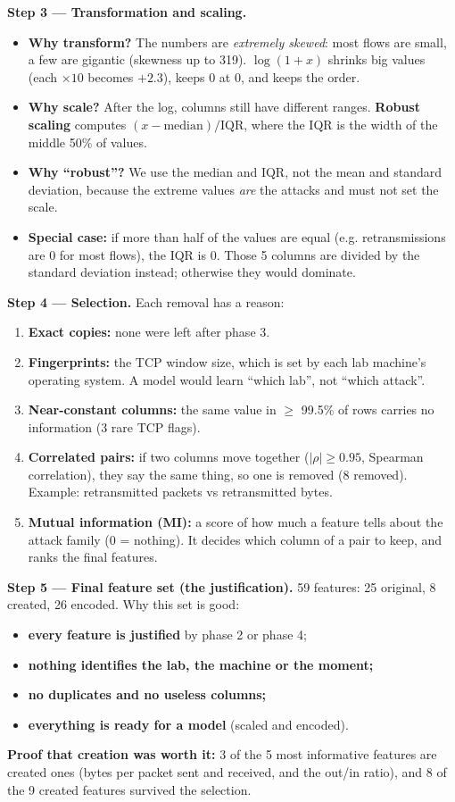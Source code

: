 \documentclass[11pt,a4paper]{article}
\begin{document}
\textbf{Step 3 --- Transformation and scaling.}
\begin{itemize}
  \item \textbf{Why transform?} The numbers are \emph{extremely skewed}: most flows are small, a few are gigantic
        (skewness up to 319). \textbf{$\log(1+x)$} shrinks big values (each $\times 10$ becomes $+2.3$), keeps 0 at 0,
        and keeps the order.
  \item \textbf{Why scale?} After the log, columns still have different ranges. \textbf{Robust scaling} computes
        $(x - \text{median}) / \text{IQR}$, where the IQR is the width of the middle 50\% of values.
  \item \textbf{Why ``robust''?} We use the median and IQR, not the mean and standard deviation, because the extreme
        values \emph{are} the attacks and must not set the scale.
  \item \textbf{Special case:} if more than half of the values are equal (e.g. retransmissions are 0 for most flows),
        the IQR is 0. Those 5 columns are divided by the standard deviation instead; otherwise they would dominate.
\end{itemize}

\textbf{Step 4 --- Selection.} Each removal has a reason:
\begin{enumerate}
  \item \textbf{Exact copies:} none were left after phase 3.
  \item \textbf{Fingerprints:} the TCP window size, which is set by each lab machine's operating system. A model would
        learn ``which lab'', not ``which attack''.
  \item \textbf{Near-constant columns:} the same value in $\geq$ 99.5\% of rows carries no information (3 rare TCP
        flags).
  \item \textbf{Correlated pairs:} if two columns move together ($|\rho| \geq 0.95$, Spearman correlation), they say the
        same thing, so one is removed (8 removed). Example: retransmitted packets vs retransmitted bytes.
  \item \textbf{Mutual information (MI):} a score of how much a feature tells about the attack family (0 = nothing). It
        decides which column of a pair to keep, and ranks the final features.
\end{enumerate}

\textbf{Step 5 --- Final feature set (the justification).} 59 features: 25 original, 8 created, 26 encoded. Why this set
is good:
\begin{itemize}
  \item \textbf{every feature is justified} by phase 2 or phase 4;
  \item \textbf{nothing identifies the lab, the machine or the moment;}
  \item \textbf{no duplicates and no useless columns;}
  \item \textbf{everything is ready for a model} (scaled and encoded).
\end{itemize}
\textbf{Proof that creation was worth it:} 3 of the 5 most informative features are created ones (bytes per packet sent
and received, and the out/in ratio), and 8 of the 9 created features survived the selection.
\end{document}

